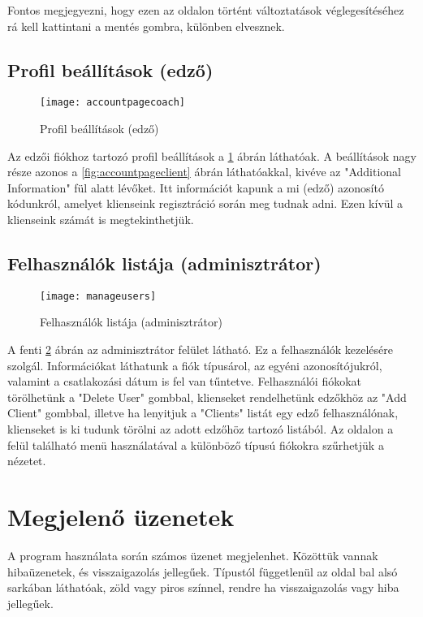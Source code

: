 Fontos megjegyezni, hogy ezen az oldalon történt változtatások véglegesítéséhez rá kell kattintani a mentés gombra, különben elvesznek.

\subsection{Profil beállítások (edző)}

\begin{figure}[H]
	\centering
	\texttt{[image: accountpagecoach]}
	\caption{Profil beállítások (edző)}
	\label{fig:accountpagecoach}
\end{figure}

Az edzői fiókhoz tartozó profil beállítások a \ref{fig:accountpagecoach} ábrán láthatóak. A beállítások nagy része azonos a \ref{fig:accountpageclient} ábrán láthatóakkal, kivéve az "Additional Information" fül alatt lévőket. Itt információt kapunk a mi (edző) azonosító kódunkról, amelyet klienseink regisztráció során meg tudnak adni. Ezen kívül a klienseink számát is megtekinthetjük.

\subsection{Felhasználók listája (adminisztrátor)}

\begin{figure}[H]
	\centering
	\texttt{[image: manageusers]}
	\caption{Felhasználók listája (adminisztrátor)}
	\label{fig:manageusers}
\end{figure}

A fenti \ref{fig:manageusers} ábrán az adminisztrátor felület látható. Ez a felhasználók kezelésére szolgál. Információkat láthatunk a fiók típusárol, az egyéni azonosítójukról, valamint a csatlakozási dátum is fel van tűntetve. Felhasználói fiókokat törölhetünk a "Delete User" gombbal, klienseket rendelhetünk edzőkhöz az "Add Client" gombbal, illetve ha lenyitjuk a "Clients" listát egy edző felhasználónak, klienseket is ki tudunk törölni az adott edzőhöz tartozó listából. Az oldalon a felül található menü használatával a különböző típusú fiókokra szűrhetjük a nézetet.

\pagebreak

\section{Megjelenő üzenetek}

A program használata során számos üzenet megjelenhet. Közöttük vannak hibaüzenetek, és visszaigazolás jellegűek. Típustól függetlenül az oldal bal alsó sarkában láthatóak, zöld vagy piros színnel, rendre ha visszaigazolás vagy hiba jellegűek.

